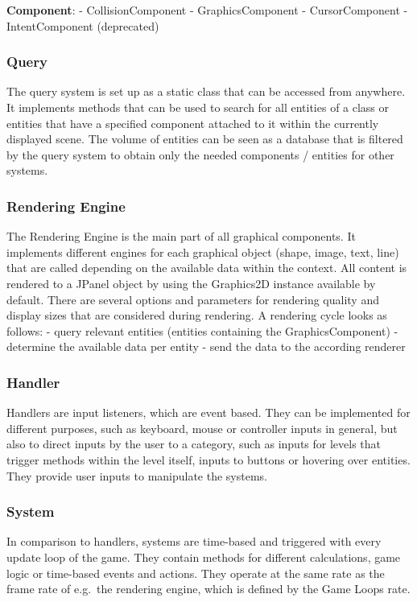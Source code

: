 \textbf{Component}:
- CollisionComponent
- GraphicsComponent
- CursorComponent
- IntentComponent (deprecated)

\subsubsection{Query}\label{subsubsec:query}
The query system is set up as a static class that can be accessed from anywhere.
It implements methods that can be used to search for all entities of a class or entities that have a specified component
attached to it within the currently displayed scene.
The volume of entities can be seen as a database that is filtered by the query system to obtain only the needed components / entities
for other systems. 

\subsubsection{Rendering Engine}\label{subsubsec:graphics-engine}
The Rendering Engine is the main part of all graphical components.
It implements different engines for each graphical object (shape, image, text, line) that are called depending on the available data within the
context.
All content is rendered to a JPanel object by using the Graphics2D instance available by default.
There are several options and parameters for rendering quality and display sizes that are considered during rendering.
A rendering cycle looks as follows:
- query relevant entities (entities containing the GraphicsComponent)
- determine the available data per entity
- send the data to the according renderer

\subsubsection{Handler}\label{subsubsec:handler}
Handlers are input listeners, which are event based.
They can be implemented for different purposes, such as keyboard, mouse or controller inputs in general, but also to direct inputs by the user
to a category, such as inputs for levels that trigger methods within the level itself, inputs to buttons or hovering over entities.
They provide user inputs to manipulate the systems.

\subsubsection{System}\label{subsubsec:system}
In comparison to handlers, systems are time-based and triggered with every update loop of the game.
They contain methods for different calculations, game logic or time-based events and actions.
They operate at the same rate as the frame rate of e.g.\ the rendering engine, which is defined by the Game Loops rate.

